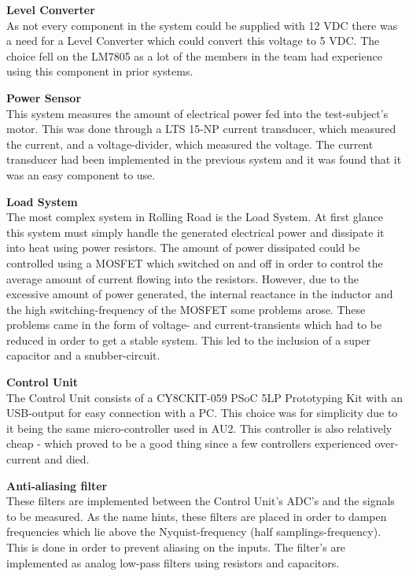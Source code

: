\textbf{Level Converter}\\
As not every component in the system could be supplied with 12 VDC there was a need for a Level Converter which could convert this voltage to 5 VDC. The choice fell on the LM7805\cite{LM7805} as a lot of the members in the team had experience using this component in prior systems.

\textbf{Power Sensor}\\
This system measures the amount of electrical power fed into the test-subject's motor. This was done through a LTS 15-NP current transducer\cite{CurrentTransducer}, which measured the current, and a voltage-divider, which measured the voltage. The current transducer had been implemented in the previous system and it was found that it was an easy component to use.

\textbf{Load System}\\ 
The most complex system in Rolling Road is the Load System. At first glance this system must simply handle the generated electrical power and dissipate it into heat using power resistors\cite{PowerResistor}. The amount of power dissipated could be controlled using a MOSFET\cite{IRFP260N} which switched on and off in order to control the average amount of current flowing into the resistors. However, due to the excessive amount of power generated, the internal reactance in the inductor and the high switching-frequency of the MOSFET some problems arose. These problems came in the form of voltage- and current-transients which had to be reduced in order to get a stable system. This led to the inclusion of a super capacitor\cite{SuperCapacitor} and a snubber-circuit\cite{Snubber}.

\textbf{Control Unit}\\
The Control Unit consists of a CY8CKIT-059 PSoC 5LP Prototyping Kit with an USB-output for easy connection with a PC. This choice was for simplicity due to it being the same micro-controller used in AU2. This controller is also relatively cheap - which proved to be a good thing since a few controllers experienced over-current and died. 

\textbf{Anti-aliasing filter}\\
These filters are implemented between the Control Unit's ADC's and the signals to be measured. As the name hints, these filters are placed in order to dampen frequencies which lie above the Nyquist-frequency (half samplings-frequency). This is done in order to prevent aliasing on the inputs. The filter's are implemented as analog low-pass filters using resistors and capacitors. 

